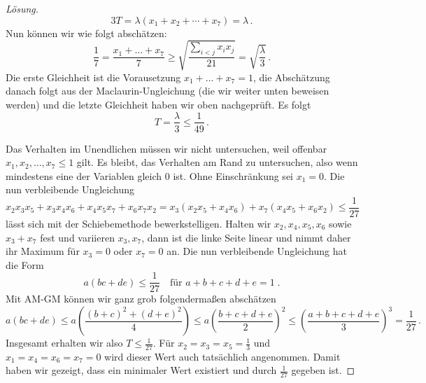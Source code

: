 \begin{proof}[Lösung]
	\begin{equation*}
		3T=\lambda(x_1+x_2+\dotsb+x_7)=\lambda\,.
	\end{equation*}
	Nun können wir wie folgt abschätzen:
	\begin{equation*}
		\frac 17=\frac{x_1+\ldots+x_7}{7}\geqslant\sqrt{\frac{\sum_{i<j}x_ix_j}{21}}=\sqrt{\frac{\lambda}{3}}\,.
	\end{equation*}
	Die erste Gleichheit ist die Vorausetzung $x_1+\ldots+x_7=1$, die Abschätzung danach folgt aus der Maclaurin-Ungleichung (die wir weiter unten beweisen werden) und die letzte Gleichheit haben wir oben nachgeprüft. Es folgt
	\begin{equation*}
		T=\frac{\lambda}{3}\leqslant\frac{1}{49}\,.
	\end{equation*}
	
	Das Verhalten im Unendlichen müssen wir nicht untersuchen, weil offenbar $x_1,x_2,\dotsc,x_7\leqslant 1$ gilt. Es bleibt, das Verhalten am Rand zu untersuchen, also wenn mindestens eine der Variablen gleich $0$ ist. Ohne Einschränkung sei $x_1=0$. Die nun verbleibende Ungleichung 
	\begin{equation*}
		x_2x_3x_5+x_3x_4x_6+x_4x_5x_7+x_6x_7x_2=x_3(x_2x_5+x_4x_6)+x_7(x_4x_5+x_6x_2)\leqslant\frac{1}{27}
	\end{equation*}
	lässt sich mit der Schiebemethode bewerkstelligen. Halten wir $x_2,x_4,x_5,x_6$ sowie $x_3+x_7$ fest und variieren $x_3,x_7$, dann ist die linke Seite linear und nimmt daher ihr Maximum für $x_3=0$ oder $x_7=0$ an. Die nun verbleibende Ungleichung hat die Form 
	\begin{equation*}
		a(bc+de)\leqslant\frac{1}{27}\quad\text{für }a+b+c+d+e=1\;.
	\end{equation*}
	Mit AM-GM können wir ganz grob folgendermaßen abschätzen
	\begin{equation*}
		a(bc+de)\leqslant a\left(\frac{(b+c)^2+(d+e)^2}{4}\right)\leqslant a\left(\frac{b+c+d+e}{2}\right)^2 \leqslant\left(\frac{a+b+c+d+e}{3}\right)^3=\frac{1}{27}\,.
	\end{equation*}
	Insgesamt erhalten wir also $T\leqslant \frac1{27}$. Für $x_2=x_3=x_5=\frac13$ und $x_1=x_4=x_6=x_7=0$ wird dieser Wert auch tatsächlich angenommen. Damit haben wir gezeigt, dass ein minimaler Wert existiert und durch $\frac1{27}$ gegeben ist.
\end{proof}


